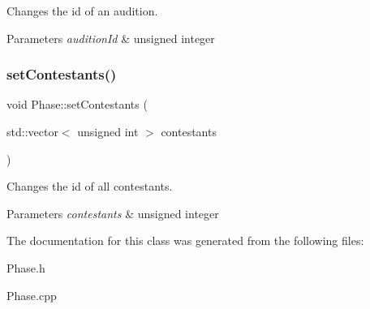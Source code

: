 Changes the id of an audition. 


\begin{DoxyParams}{Parameters}
{\em audition\+Id} & unsigned integer \\
\hline
\end{DoxyParams}
\mbox{\label{class_phase_a3a08956302c65b5ccea41521059a787c}} 
\subsubsection{\texorpdfstring{set\+Contestants()}{setContestants()}}
{\footnotesize\ttfamily void Phase\+::set\+Contestants (\begin{DoxyParamCaption}\item[{std\+::vector$<$ unsigned int $>$}]{contestants }\end{DoxyParamCaption})}



Changes the id of all contestants. 


\begin{DoxyParams}{Parameters}
{\em contestants} & unsigned integer \\
\hline
\end{DoxyParams}


The documentation for this class was generated from the following files\+:\begin{DoxyCompactItemize}
\item 
Phase.\+h\item 
Phase.\+cpp\end{DoxyCompactItemize}
